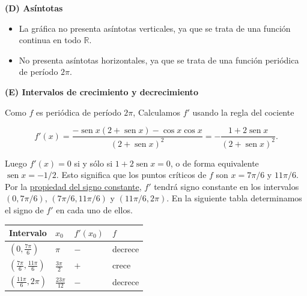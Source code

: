 \documentclass[
  letterpaper,
]{book}
\theoremstyle{plain}
\theoremstyle{remark}
\begin{document}
\begin{tcolorbox}
\textbf{(D) Asíntotas}

\begin{itemize}
\item
  La gráfica no presenta asíntotas verticales, ya que se trata de una
  función continua en todo \(\mathbb{R}\).
\item
  No presenta asíntotas horizontales, ya que se trata de una función
  periódica de período \(2\pi\).
\end{itemize}

\textbf{(E) Intervalos de crecimiento y decrecimiento}

Como \(f\) es periódica de período \(2\pi\), Calculamos \(f'\) usando la
regla del cociente

\[
f'(x)=\frac{-\operatorname{sen} x(2+\operatorname{sen} x)-\cos x\cos x}{(2+\operatorname{sen} x)^2}=-\frac{1+2\operatorname{sen} x}{(2+\operatorname{sen} x)^2}.
\]

Luego \(f'(x)=0\) si y sólo si \(1+2\operatorname{sen} x=0\), o de forma
equivalente \(\operatorname{sen} x=-1/2\). Esto significa que los puntos
críticos de \(f\) son \(x=7\pi/6\) y \(11\pi/6\). Por la
\hyperref[teo-propiedad-signoconst]{propiedad del signo constante},
\(f'\) tendrá signo constante en los intervalos \((0, 7\pi/6)\),
\((7\pi/6,11\pi/6)\) y \((11\pi/6,2\pi)\). En la siguiente tabla
determinamos el signo de \(f'\) en cada uno de ellos.

\begin{longtable}[]{@{}
  >{\raggedright\arraybackslash}p{}
  >{\raggedright\arraybackslash}p{}
  >{\raggedright\arraybackslash}p{}
  >{\raggedright\arraybackslash}p{}@{}}
\toprule\noalign{}
\begin{minipage}[b]{\linewidth}\raggedright
Intervalo
\end{minipage} & \begin{minipage}[b]{\linewidth}\raggedright
\(x_0\)
\end{minipage} & \begin{minipage}[b]{\linewidth}\raggedright
\(f'(x_0)\)
\end{minipage} & \begin{minipage}[b]{\linewidth}\raggedright
\(f\)
\end{minipage} \\
\midrule\noalign{}
\endhead
\bottomrule\noalign{}
\endlastfoot
\(\displaystyle \left(0, \frac{7\pi}{6}\right)\) & \(\pi\) & \(-\) &
decrece \\
\(\displaystyle \left(\frac{7\pi}{6}, \frac{11\pi}{6}\right)\) &
\(\displaystyle\frac{3\pi}{2}\) & \(+\) & crece \\
\(\displaystyle \left(\frac{11\pi}{6}, 2\pi\right)\) &
\(\displaystyle\frac{23\pi}{12}\) & \(-\) & decrece \\
\end{longtable}


\end{tcolorbox}
\end{document}
